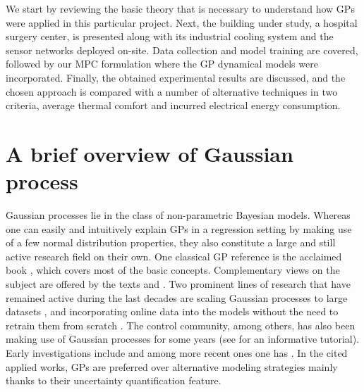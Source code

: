 We start by reviewing the basic theory that is necessary to understand how GPs were applied in this particular project. Next, the building under study, a hospital surgery center, is presented along with its industrial cooling system and the sensor networks deployed on-site. Data collection and model training are covered, followed by our MPC formulation where the GP dynamical models were incorporated. Finally, the obtained experimental results are discussed, and the chosen approach is compared with a number of alternative techniques in two criteria, average thermal comfort and incurred electrical energy consumption.

\section{A brief overview of Gaussian process}
\label{sec.gps}

Gaussian processes lie in the class of non-parametric Bayesian models. Whereas one can easily and intuitively explain GPs in a regression setting by making use of a few normal distribution properties, they also constitute a large and still active research field on their own.
One classical GP reference is the acclaimed book \cite{williams2006gaussian}, which covers most of the basic concepts. Complementary views on the subject are offered by the texts \cite{gramacy2020surrogates} and \cite{kanagawa2018gaussian}.
Two prominent lines of research that have remained active during the last decades are scaling Gaussian processes to large datasets \citep{ferrari1998finite,quinonero2005unifying,yang2012nystrom,bauer2016understanding,bui2017unifying,lederer2021gaussian}, and incorporating online data into the models without the need to retrain them from scratch \citep{csato2002sparse,bui2017streaming,maddox2021conditioning}. The control community, among others, has also been making use of Gaussian processes for some years (see \cite{liu2018gaussian} for an informative tutorial). Early investigations include \cite{kocijan2003predictive,hansen2005nonparametric} and among more recent ones one has \cite{diwale2014optimization,hewing2019cautious,lederer2022cooperative,khosravi2022safety}. In the cited applied works, GPs are preferred over alternative modeling strategies mainly thanks to their uncertainty quantification feature. 

